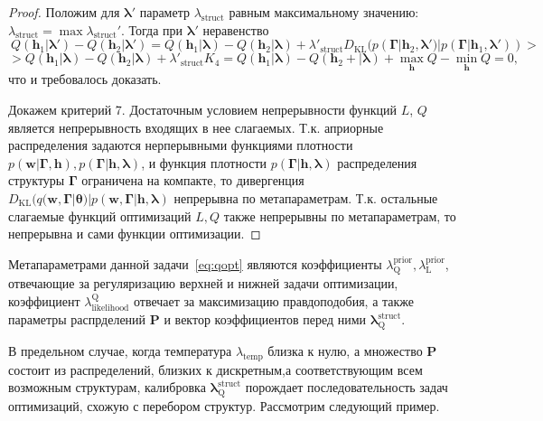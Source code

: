 \begin{proof}
Положим для $\boldsymbol{\lambda}'$ параметр $\lambda_\text{struct}$ равным максимальному значению: $\lambda_\text{struct} = \max \lambda_\text{struct}'$.
Тогда при $\boldsymbol{\lambda}'$ неравенство 
\[\
Q(\mathbf{h}_1|\boldsymbol{\lambda}')-Q(\mathbf{h}_2|\boldsymbol{\lambda}')  = Q(\mathbf{h}_1|\boldsymbol{\lambda})-Q(\mathbf{h}_2|\boldsymbol{\lambda})  + \lambda'_\text{struct} D_\text{KL}(p(\boldsymbol{\Gamma}|\mathbf{h}_2,\boldsymbol{\lambda}')|p(\boldsymbol{\Gamma}|\mathbf{h}_1,\boldsymbol{\lambda}')) >
\]
\[
  > Q(\mathbf{h}_1|\boldsymbol{\lambda})-Q(\mathbf{h}_2|\boldsymbol{\lambda})  +  \lambda'_\text{struct}K_4   = Q(\mathbf{h}_1|\boldsymbol{\lambda})-Q(\mathbf{h}_2 + |\boldsymbol{\lambda})  + \max_{\mathbf{h}} Q - \min_{\mathbf{h}} Q   =0,
\]
что и требовалось доказать.

Докажем критерий 7. Достаточным условием непрерывности функций $L$, $Q$ является непрерывность входящих в нее слагаемых. 
Т.к. априорные распределения задаются нерперывными функциями плотности $p(\mathbf{w}|\boldsymbol{\Gamma},\mathbf{h}), p(\boldsymbol{\Gamma}|\mathbf{h},\boldsymbol{\lambda})$, и функция плотности $p(\boldsymbol{\Gamma}|\mathbf{h},\boldsymbol{\lambda})$ распределения структуры $\boldsymbol{\Gamma}$ ограничена на компакте, то дивергенция $D_\text{KL}(q(\mathbf{w}, \boldsymbol{\Gamma}|\boldsymbol{\theta})|p(\mathbf{w}, \boldsymbol{\Gamma}|\mathbf{h},\boldsymbol{\lambda})$ непрерывна по метапараметрам.
Т.к. остальные слагаемые функций оптимизаций $L,Q$ также непрерывны по метапараметрам, то непрерывна и сами функции оптимизации.
\end{proof}

Метапараметрами данной задачи~\eqref{eq:qopt} являются коэффициенты $\lambda^\text{prior}_\text{Q}, \lambda^\text{prior}_\text{L}$, отвечающие за регуляризацию верхней и нижней задачи оптимизации, коэффициент $\lambda_\text{likelihood}^\text{Q}$ отвечает за максимизацию правдоподобия, а также параметры распрделений $\mathbf{P}$ и вектор коэффициентов перед ними $\boldsymbol{\lambda}^\text{struct}_\text{Q}$. 

В предельном случае, когда температура $\lambda_\text{temp}$ близка к нулю, а множество $\mathbf{P}$ состоит из распределений, близких к дискретным,а соответствующим всем возможным структурам, калибровка $\boldsymbol{\lambda}^\text{struct}_\text{Q}$ порождает последовательность задач оптимизаций, схожую с перебором структур. Рассмотрим следующий пример. 

